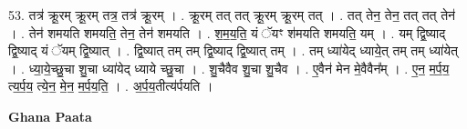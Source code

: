 \documentclass[17pt]{extarticle}
\begin{document}
53. तत्र॑ क्रू॒रम् क्रू॒रम् तत्र॒ तत्र॑ क्रू॒रम् । . क्रू॒रम् तत् तत् क्रू॒रम् क्रू॒रम् तत् । . तत् तेन॒ तेन॒ तत् तत् तेन॑ । . तेन॑ शमयति शमयति॒ तेन॒ तेन॑ शमयति । . श॒म॒य॒ति॒ यं ॅयꣳ श॑मयति शमयति॒ यम् । . यम् द्वि॒ष्याद् द्वि॒ष्याद् यं ॅयम् द्वि॒ष्यात् । . द्वि॒ष्यात् तम् तम् द्वि॒ष्याद् द्वि॒ष्यात् तम् । . तम् ध्या॑येद् ध्याये॒त् तम् तम् ध्या॑येत् । . ध्या॒ये॒च्छु॒चा शु॒चा ध्या॑येद् ध्याये च्छु॒चा । . शु॒चैवैव शु॒चा शु॒चैव । . ए॒वैन॑ मेन मे॒वैवैन᳚म् । . ए॒न॒ म॒र्प॒य॒ त्य॒र्प॒य॒ त्ये॒न॒ मे॒न॒ म॒र्प॒य॒ति॒ । . अ॒र्प॒य॒तीत्य॑र्पयति । \newline

\textbf{Ghana Paata } \newline
\end{document}

